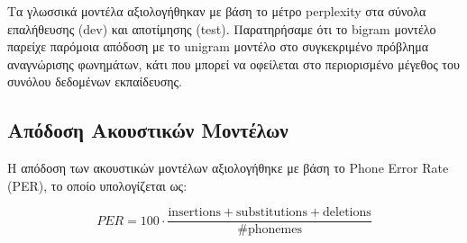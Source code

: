 \documentclass[a4paper,12pt]{article}
\begin{document}
Τα γλωσσικά μοντέλα αξιολογήθηκαν με βάση το μέτρο perplexity στα σύνολα επαλήθευσης (dev) και αποτίμησης (test). Παρατηρήσαμε ότι το bigram μοντέλο παρείχε παρόμοια απόδοση με το unigram μοντέλο στο συγκεκριμένο πρόβλημα αναγνώρισης φωνημάτων, κάτι που μπορεί να οφείλεται στο περιορισμένο μέγεθος του συνόλου δεδομένων εκπαίδευσης.

\subsection{Απόδοση Ακουστικών Μοντέλων}

Η απόδοση των ακουστικών μοντέλων αξιολογήθηκε με βάση το Phone Error Rate (PER), το οποίο υπολογίζεται ως:

\begin{equation}
PER = 100 \cdot \frac{\text{insertions} + \text{substitutions} + \text{deletions}}{\text{#phonemes}}
\end{equation}




\end{document}

